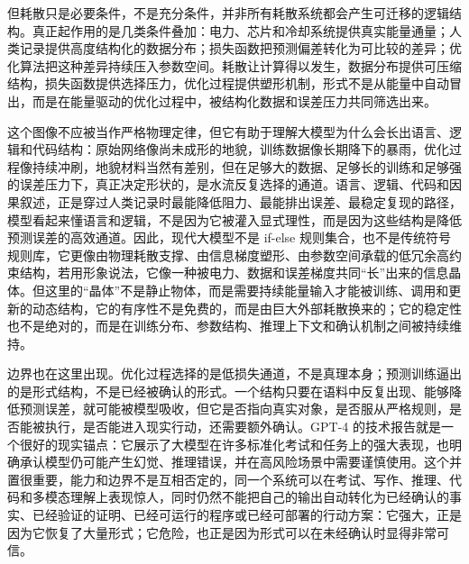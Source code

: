 但耗散只是必要条件，不是充分条件，并非所有耗散系统都会产生可迁移的逻辑结构。真正起作用的是几类条件叠加：电力、芯片和冷却系统提供真实能量通量；人类记录提供高度结构化的数据分布；损失函数把预测偏差转化为可比较的差异；优化算法把这种差异持续压入参数空间。耗散让计算得以发生，数据分布提供可压缩结构，损失函数提供选择压力，优化过程提供塑形机制，形式不是从能量中自动冒出，而是在能量驱动的优化过程中，被结构化数据和误差压力共同筛选出来。

这个图像不应被当作严格物理定律，但它有助于理解大模型为什么会长出语言、逻辑和代码结构：原始网络像尚未成形的地貌，训练数据像长期降下的暴雨，优化过程像持续冲刷，地貌材料当然有差别，但在足够大的数据、足够长的训练和足够强的误差压力下，真正决定形状的，是水流反复选择的通道。语言、逻辑、代码和因果叙述，正是穿过人类记录时最能降低阻力、最能排出误差、最稳定复现的路径，模型看起来懂语言和逻辑，不是因为它被灌入显式理性，而是因为这些结构是降低预测误差的高效通道。因此，现代大模型不是 if-else 规则集合，也不是传统符号规则库，它更像由物理耗散支撑、由信息梯度塑形、由参数空间承载的低冗余高约束结构，若用形象说法，它像一种被电力、数据和误差梯度共同“长”出来的信息晶体。但这里的“晶体”不是静止物体，而是需要持续能量输入才能被训练、调用和更新的动态结构，它的有序性不是免费的，而是由巨大外部耗散换来的；它的稳定性也不是绝对的，而是在训练分布、参数结构、推理上下文和确认机制之间被持续维持。


边界也在这里出现。优化过程选择的是低损失通道，不是真理本身；预测训练逼出的是形式结构，不是已经被确认的形式。一个结构只要在语料中反复出现、能够降低预测误差，就可能被模型吸收，但它是否指向真实对象，是否服从严格规则，是否能被执行，是否能进入现实行动，还需要额外确认。GPT-4 的技术报告就是一个很好的现实锚点：它展示了大模型在许多标准化考试和任务上的强大表现，也明确承认模型仍可能产生幻觉、推理错误，并在高风险场景中需要谨慎使用\cite{openai2023gpt4}。这个并置很重要，能力和边界不是互相否定的，同一个系统可以在考试、写作、推理、代码和多模态理解上表现惊人，同时仍然不能把自己的输出自动转化为已经确认的事实、已经验证的证明、已经可运行的程序或已经可部署的行动方案：它强大，正是因为它恢复了大量形式；它危险，也正是因为形式可以在未经确认时显得非常可信。

